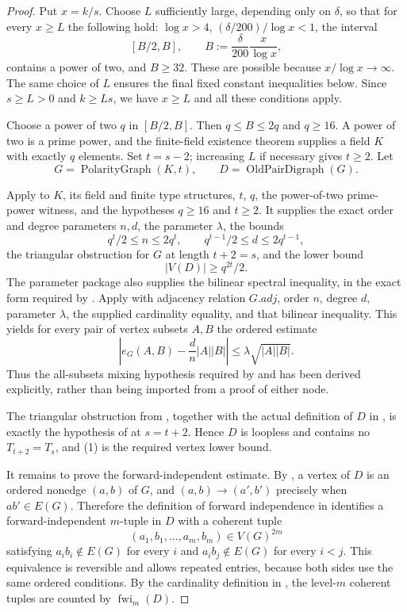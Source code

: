 \begin{proof}
Put $x=k/s$.  Choose $L$ sufficiently large, depending only on $\delta$,
so that for every $x\geq L$ the following hold: $\log x>4$,
$(\delta/200)/\log x<1$, the interval
\[
[B/2,B],\qquad B:=\frac{\delta}{200}\frac{x}{\log x},
\]
contains a power of two, and $B\geq32$.  These are possible because
$x/\log x\to\infty$.  The same choice of $L$ ensures the final fixed
constant inequalities below.  Since $s\geq L>0$ and $k\geq Ls$, we have
$x\geq L$ and all these conditions apply.

Choose a power of two $q$ in $[B/2,B]$.  Then
$q\leq B\leq2q$ and $q\geq16$.  A power of two is a prime power, and the
finite-field existence theorem supplies a field $K$ with exactly $q$
elements.  Set $t=s-2$; increasing $L$ if necessary gives $t\geq2$.
Let
\[
 G=\operatorname{PolarityGraph}(K,t),\qquad
 D=\operatorname{OldPairDigraph}(G).
\]

Apply  to $K$, its field and finite type
structures, $t$, $q$, the power-of-two prime-power witness, and the
hypotheses $q\geq16$ and $t\geq2$.  It supplies the exact order and degree
parameters $n,d$, the parameter $\lambda$, the bounds
\[
 q^t/2\leq n\leq2q^t,\qquad
 q^{t-1}/2\leq d\leq2q^{t-1},
\]
the triangular obstruction for $G$ at length $t+2=s$, and the lower bound
\[
 |V(D)|\geq q^{2t}/2. \tag{1}
\]
The parameter package also supplies the bilinear spectral inequality, in
the exact form required by .  Apply
 with adjacency relation $G.adj$, order $n$, degree
$d$, parameter $\lambda$, the supplied cardinality equality, and that
bilinear inequality.  This yields for every pair of vertex subsets $A,B$
the ordered estimate
\[
 \left|e_G(A,B)-\frac dn|A||B|\right|
 \leq\lambda\sqrt{|A||B|}. \tag{2}
\]
Thus the all-subsets mixing hypothesis required by
 and  has been
derived explicitly, rather than being imported from a proof of either
node.

The triangular obstruction from , together
with the actual definition of $D$ in , is exactly
the hypothesis of  at $s=t+2$.  Hence $D$
is loopless and contains no $T_{t+2}=T_s$, and (1) is the required vertex
lower bound.

It remains to prove the forward-independent estimate.  By
, a vertex of $D$ is an ordered nonedge $(a,b)$ of
$G$, and $(a,b)\to(a',b')$ precisely when $ab'\in E(G)$.  Therefore the
definition of forward independence in 
identifies a forward-independent $m$-tuple in $D$ with a coherent tuple
\[
 (a_1,b_1,\ldots,a_m,b_m)\in V(G)^{2m}
\]
satisfying $a_i b_i\notin E(G)$ for every $i$ and
$a_i b_j\notin E(G)$ for every $i<j$.  This equivalence is reversible and
allows repeated entries, because both sides use the same ordered
conditions.  By the cardinality definition in
, the level-$m$ coherent tuples are
counted by $\operatorname{fwi}_m(D)$.


\end{proof}
